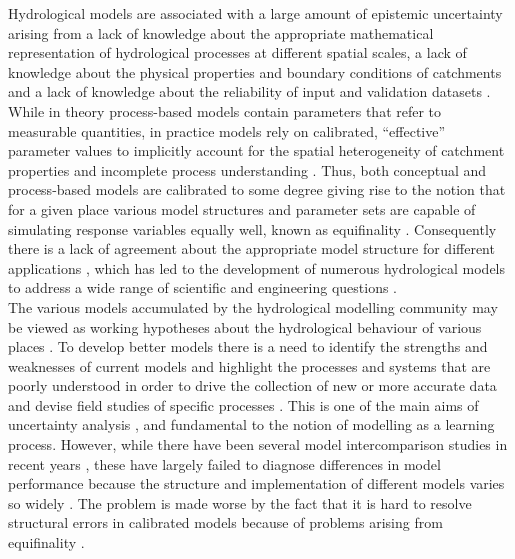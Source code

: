 \documentclass{icldt}\usepackage[]{graphicx}\usepackage[]{color}
\begin{document}
Hydrological models are associated with a large amount of epistemic uncertainty arising from a lack of knowledge about the appropriate mathematical representation of hydrological processes at different spatial scales, a lack of knowledge about the physical properties and boundary conditions of catchments and a lack of knowledge about the reliability of input and validation datasets \citep{beven1989,beven2012,clark2011,clark2015,gupta2012,mount2016}. While in theory process-based models contain parameters that refer to measurable quantities, in practice models rely on calibrated, ``effective'' parameter values to implicitly account for the spatial heterogeneity of catchment properties and incomplete process understanding \citep{mcdonnell2007,savenije2009,sivakumar2009,beven2012}. Thus, both conceptual and process-based models are calibrated to some degree giving rise to the notion that for a given place various model structures and parameter sets are capable of simulating response variables equally well, known as equifinality \citep{beven2001,beven2006-a,beven2012-b}. Consequently there is a lack of agreement about the appropriate model structure for different applications \citep{}, which has led to the development of numerous hydrological models to address a wide range of scientific and engineering questions \citep{beven2001,clark2011,weiler2015}. \\

The various models accumulated by the hydrological modelling community may be viewed as working hypotheses about the hydrological behaviour of various places \citep{clark2008,savenije2009,clark2011,gupta2014}. To develop better models there is a need to identify the strengths and weaknesses of current models and highlight the processes and systems that are poorly understood in order to drive the collection of new or more accurate data and devise field studies of specific processes \citep{buytaert2008,clark2012,gupta2012}. This is one of the main aims of uncertainty analysis \citep{buytaert2008,clark2012,gupta2012}, and fundamental to the notion of modelling as a learning process. However, while there have been several model intercomparison studies in recent years \citep[e.g.][]{wood1998,yang2000,reed2004,pebesma2005,duan2006,breuer2009,smith2012}, these have largely failed to diagnose differences in model performance because the structure and implementation of different models varies so widely \citep{kampf2007,fenicia2008,clark2011,clark2015}. The problem is made worse by the fact that it is hard to resolve structural errors in calibrated models because of problems arising from equifinality \citep{kirchner2006}. \\ 
\end{document}
